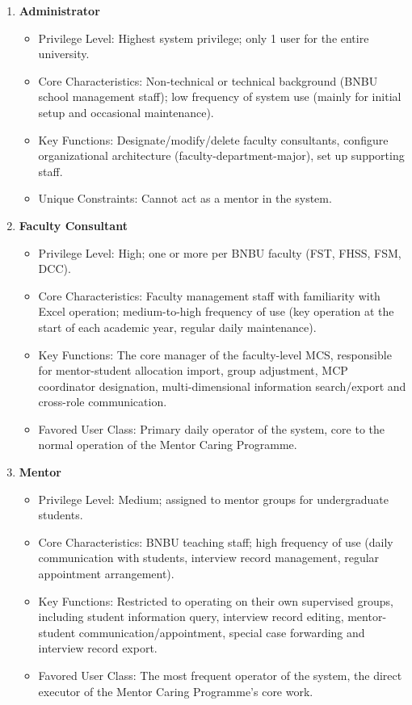 \begin{enumerate}
\item \textbf{Administrator}
\begin{itemize}
\item Privilege Level: Highest system privilege; only 1 user for the entire university.
\item Core Characteristics: Non-technical or technical background (BNBU school management staff); low frequency of system use (mainly for initial setup and occasional maintenance).
\item Key Functions: Designate/modify/delete faculty consultants, configure organizational architecture (faculty-department-major), set up supporting staff.
\item Unique Constraints: Cannot act as a mentor in the system.
\end{itemize}

\item \textbf{Faculty Consultant}
\begin{itemize}
\item Privilege Level: High; one or more per BNBU faculty (FST, FHSS, FSM, DCC).
\item Core Characteristics: Faculty management staff with familiarity with Excel operation; medium-to-high frequency of use (key operation at the start of each academic year, regular daily maintenance).
\item Key Functions: The core manager of the faculty-level MCS, responsible for mentor-student allocation import, group adjustment, MCP coordinator designation, multi-dimensional information search/export and cross-role communication.
\item Favored User Class: Primary daily operator of the system, core to the normal operation of the Mentor Caring Programme.
\end{itemize}

\item \textbf{Mentor}
\begin{itemize}
\item Privilege Level: Medium; assigned to mentor groups for undergraduate students.
\item Core Characteristics: BNBU teaching staff; high frequency of use (daily communication with students, interview record management, regular appointment arrangement).
\item Key Functions: Restricted to operating on their own supervised groups, including student information query, interview record editing, mentor-student communication/appointment, special case forwarding and interview record export.
\item Favored User Class: The most frequent operator of the system, the direct executor of the Mentor Caring Programme's core work.
\end{itemize}


\end{enumerate}
